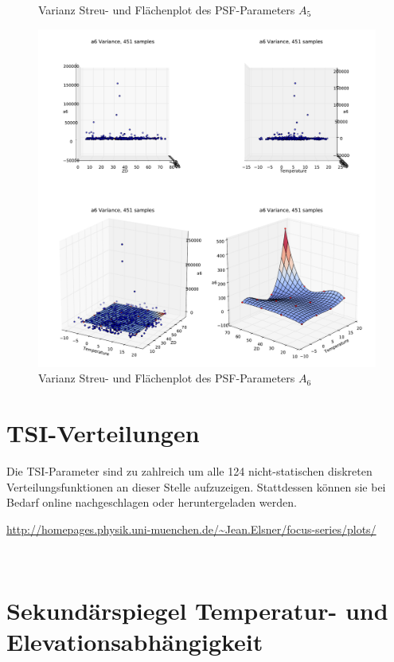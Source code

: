 \begin{appendix}
\begin{figure}[H]
	\caption[Varianz Streu- und Flächenplot des PSF-Parameters $A_5$]{Varianz Streu- und Flächenplot des PSF-Parameters $A_5$}
    \label{psf_surf_a5_var}
\end{figure}
\begin{figure}[H]
	\centering
	\includegraphics[scale=.48]{psf_surf/a6_var.pdf}
	\caption[Varianz Streu- und Flächenplot des PSF-Parameters $A_6$]{Varianz Streu- und Flächenplot des PSF-Parameters $A_6$}
    \label{psf_surf_a6_var}
\end{figure}

\section{TSI-Verteilungen}
Die TSI-Parameter sind zu zahlreich um alle 124 nicht-statischen diskreten Verteilungsfunktionen an dieser Stelle aufzuzeigen. Stattdessen können sie bei Bedarf online nachgeschlagen oder heruntergeladen werden.
\begin{mdframed}[style=emphasis]
	\centering
	\url{http://homepages.physik.uni-muenchen.de/~Jean.Elsner/focus-series/plots/}
\end{mdframed}
\vfill\,

\section{Sekundärspiegel Temperatur- und Elevationsabhängigkeit}


\end{appendix}
